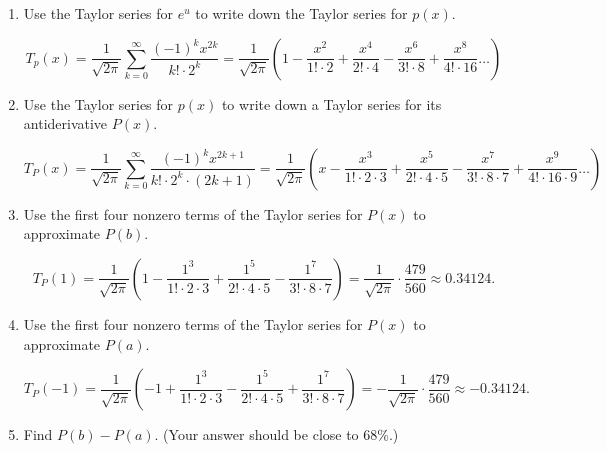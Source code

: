 \begin{enumerate}[leftmargin=0pt]
    \begin{red}
    \[e^u = \sum_{k=0}^\infty \frac{1}{k!} u^k = 1 + \frac{u}{1!} + \frac{u^2}{2!} + \frac{u^3}{3!} + \ldots \]
    \end{red}
    \item Use the Taylor series for $e^u$ to write down the Taylor series for $p(x).$
    \begin{red}
    \[T_p(x) = \frac{1}{\sqrt{2\pi}} \sum_{k=0}^\infty \frac{(-1)^k x^{2k}}{k!\cdot 2^k} = \frac{1}{\sqrt{2\pi}} \left(1 - \frac{x^2}{1! \cdot 2} + \frac{x^4}{2!\cdot 4} - \frac{x^6}{3!\cdot 8} + \frac{x^8}{4! \cdot 16} \ldots \right) \]
    \end{red}
    \item Use the Taylor series for $p(x)$ to write down a Taylor series for its antiderivative $P(x)$.    
    \begin{red}    
    \[T_P(x) = \frac{1}{\sqrt{2\pi}} \sum_{k=0}^\infty \frac{(-1)^k x^{2k+1} }{k!\cdot 2^k \cdot (2k+1)} = \frac{1}{\sqrt{2\pi}} \left(x - \frac{x^3}{1! \cdot 2\cdot 3} + \frac{x^5}{2!\cdot 4\cdot 5} - \frac{x^7}{3!\cdot 8 \cdot 7} + \frac{x^9}{4! \cdot 16\cdot 9} \ldots \right)\]
    \end{red}
    \item Use the first four nonzero terms of the Taylor series for $P(x)$ to approximate $P(b)$.     
    \begin{red}
    \[T_P(1) = \frac{1}{\sqrt{2\pi}} \left(1 - \frac{1^3}{1! \cdot 2\cdot 3} + \frac{1^5}{2!\cdot 4\cdot 5} - \frac{1^7}{3!\cdot 8 \cdot 7}\right) = \frac{1}{\sqrt{2\pi}}\cdot  \frac{479}{560} \approx 0.34124.\]
    \end{red}
    \item Use the first four nonzero terms of the Taylor series for $P(x)$ to approximate $P(a)$.    
    \begin{red}
    \[T_P(-1) = \frac{1}{\sqrt{2\pi}} \left(-1 + \frac{1^3}{1! \cdot 2\cdot 3} - \frac{1^5}{2!\cdot 4\cdot 5} + \frac{1^7}{3!\cdot 8 \cdot 7}\right) = -\frac{1}{\sqrt{2\pi}}\cdot  \frac{479}{560} \approx -0.34124.\]
    \end{red}
    \item Find $P(b) - P(a)$. (Your answer should be close to 68\%.)
    

\end{enumerate}
